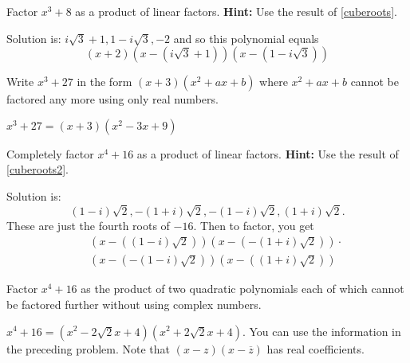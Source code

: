 \begin{enumialphparenastyle}
\begin{ex} Factor $x^{3}+8$ as a product of linear factors. \textbf{Hint:} Use the result of \ref{cuberoots}.
\begin{sol}
Solution
is: $i\sqrt{3}+1,1-i\sqrt{3},-2$ and so this polynomial equals
\[
\left( x+2\right) \left( x-\left( i\sqrt{3}+1\right) \right) \left( x-\left(
1-i\sqrt{3}\right) \right)
\]
\end{sol}
\end{ex}

\begin{ex} Write $x^{3}+27$ in the form $\left( x+3\right) \left(
x^{2}+ax+b\right) $ where $x^{2}+ax+b$ cannot be factored any more using
only real numbers. 
\begin{sol}
$x^{3}+27= \left( x+3\right) \left(
x^{2}-3x+9\right) $
\end{sol}
\end{ex}

\begin{ex} Completely factor $x^{4}+16$ as a product of linear factors. \textbf{Hint:} Use the result of \ref{cuberoots2}. 
\begin{sol}
Solution is:
\[
\left( 1-i\right) \sqrt{2},-\left( 1+i\right) \sqrt{2},-\left( 1-i\right)
\sqrt{2},\left( 1+i\right) \sqrt{2}.
\]
These are just the fourth roots of $-16$. Then to factor, you get
\begin{eqnarray*}
&&\left( x-\left( \left( 1-i\right) \sqrt{2}\right) \right) \left( x-\left(
-\left( 1+i\right) \sqrt{2}\right) \right) \cdot \\
&&\left( x-\left( -\left( 1-i\right) \sqrt{2}\right) \right) \left( x-\left(
\left( 1+i\right) \allowbreak \sqrt{2}\right) \right)
\end{eqnarray*}
\end{sol}
\end{ex}


\begin{ex} Factor $x^{4}+16$ as the product of two quadratic polynomials each of
which cannot be factored further without using complex numbers. 
\begin{sol}
$x^{4}+16=\left( x^{2}-2\sqrt{2}x+4\right) \left( x^{2}+2\sqrt{2}x+4\right) .
$ You can use the information in the preceding problem. Note that $\left(
x-z\right) \left( x-\overline{z}\right) $ has real coefficients.
\end{sol}
\end{ex}


\end{enumialphparenastyle}
